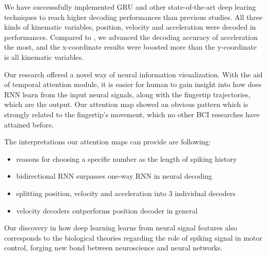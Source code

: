 We have successsfully implemented GRU and other state-of-the-art deep learing techniques to reach higher decoding performances than previous studies.
All three kinds of kinematic variables, position, velocity and acceleration were decoded in performances.
Compared to \cite{makin2018}, we advanced the decoding accuracy of acceleration the most,
and the x-coordinate results were boosted more than the y-coordinate is all kinematic variables.

Our research offered a novel way of neural information visualization.
With the aid of temporal attention module,
it is easier for human to gain insight into how does RNN learn from the input neural signals,
along with the fingertip trajectories, which are the output.
Our attention map showed an obvious pattern which is strongly related to the fingertip's movement,
which no other BCI researches have attained before.

The interpretations our attention maps can provide are following:
\begin{itemize}
    \item reasons for choosing a specific number as the length of spiking history 
    \item bidirectional RNN surpasses one-way RNN in neural decoding
    \item splitting position, velocity and acceleration into 3 individual decoders
    \item velocity decoders outperforms position decoder in general
\end{itemize}

Our discovery in how deep learning learns from neural signal features also corresponds to the biological theories regarding the role of spiking signal in motor control,
forging new bond between neuroscience and neural networks.
